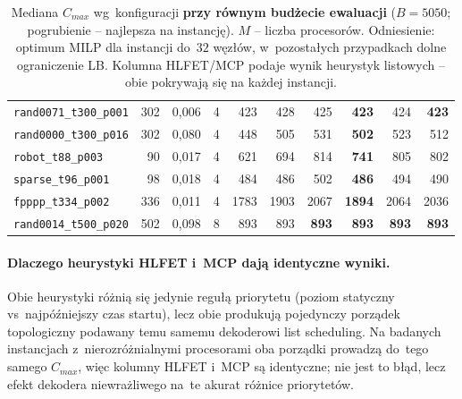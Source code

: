 \documentclass[pdflatex,sn-mathphys,Numbered]{sn-jnl}
\begin{document}
\begin{table}[ht]
\begin{tabular}{lrrrrrrrrr}
\texttt{rand0071\_t300\_p001} & 302 & 0{,}006 & 4 & 423 &  428 & 425          & \textbf{423} & 424          & \textbf{423} \\
\texttt{rand0000\_t300\_p016} & 302 & 0{,}080 & 4 & 448 &  505 & 531          & \textbf{502} & 523          & 512 \\
\texttt{robot\_t88\_p003}     &  90 & 0{,}017 & 4 & 621 &  694 & 814          & \textbf{741} & 805          & 802 \\
\texttt{sparse\_t96\_p001}    &  98 & 0{,}018 & 4 & 484 &  486 & 502          & \textbf{486} & 494          & 490 \\
\texttt{fpppp\_t334\_p002}    & 336 & 0{,}011 & 4 &1783 & 1903 & 2067         & \textbf{1894}& 2064         & 2036 \\
\texttt{rand0014\_t500\_p020} & 502 & 0{,}098 & 8 & 893 &  893 & \textbf{893} & \textbf{893} & \textbf{893} & \textbf{893} \\
\bottomrule
\end{tabular}
\caption{Mediana $C_{max}$ wg~konfiguracji \textbf{przy równym budżecie ewaluacji}
($B=5050$; pogrubienie -- najlepsza na instancję). $M$ -- liczba procesorów.
Odniesienie: optimum MILP dla instancji do~$32$ węzłów, w~pozostałych przypadkach
dolne ograniczenie LB. Kolumna HLFET/MCP podaje wynik heurystyk listowych -- obie
pokrywają się na każdej instancji.}
\label{tab:main}
\end{table}

\paragraph{Dlaczego heurystyki HLFET i~MCP dają identyczne wyniki.}
Obie heurystyki różnią się jedynie regułą priorytetu (poziom statyczny vs~najpóźniejszy
czas startu), lecz obie produkują pojedynczy porządek topologiczny podawany temu
samemu dekoderowi list scheduling. Na badanych instancjach z~nierozróżnialnymi
procesorami oba porządki prowadzą do~tego samego $C_{max}$, więc kolumny HLFET
i~MCP są identyczne; nie jest to błąd, lecz efekt dekodera niewrażliwego na~te
akurat różnice priorytetów.
\end{document}
